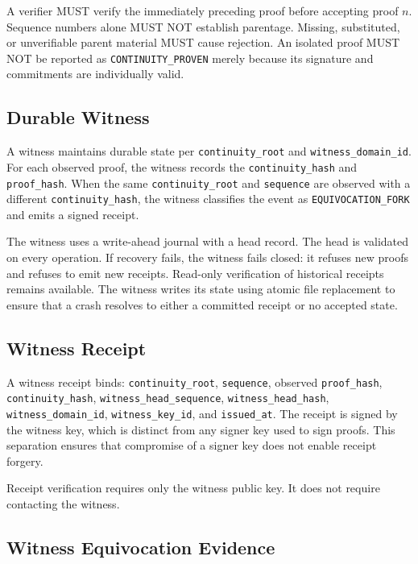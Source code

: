 \documentclass[11pt,a4paper]{article}
\begin{document}
A verifier MUST verify the immediately preceding proof before accepting proof $n$. Sequence numbers alone MUST NOT establish parentage. Missing, substituted, or unverifiable parent material MUST cause rejection. An isolated proof MUST NOT be reported as \texttt{CONTINUITY\_PROVEN} merely because its signature and commitments are individually valid.

\subsection{Durable Witness}

A witness maintains durable state per \texttt{continuity\_root} and \texttt{witness\_domain\_id}. For each observed proof, the witness records the \texttt{continuity\_hash} and \texttt{proof\_hash}. When the same \texttt{continuity\_root} and \texttt{sequence} are observed with a different \texttt{continuity\_hash}, the witness classifies the event as \texttt{EQUIVOCATION\_FORK} and emits a signed receipt.

The witness uses a write-ahead journal with a head record. The head is validated on every operation. If recovery fails, the witness fails closed: it refuses new proofs and refuses to emit new receipts. Read-only verification of historical receipts remains available. The witness writes its state using atomic file replacement to ensure that a crash resolves to either a committed receipt or no accepted state.

\subsection{Witness Receipt}

A witness receipt binds: \texttt{continuity\_root}, \texttt{sequence}, observed \texttt{proof\_hash}, \texttt{continuity\_hash}, \texttt{witness\_head\_sequence}, \texttt{witness\_head\_hash}, \texttt{witness\_domain\_id}, \texttt{witness\_key\_id}, and \texttt{issued\_at}. The receipt is signed by the witness key, which is distinct from any signer key used to sign proofs. This separation ensures that compromise of a signer key does not enable receipt forgery.

Receipt verification requires only the witness public key. It does not require contacting the witness.

\subsection{Witness Equivocation Evidence}
\end{document}
